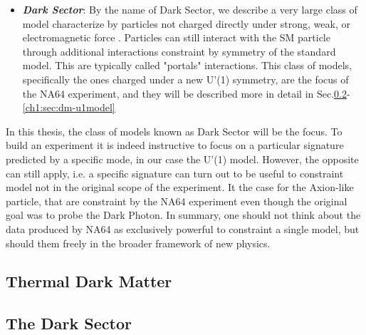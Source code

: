 \begin{itemize}
\item \textbf{\textit{Dark Sector}}: By the name of Dark Sector, we describe a very large class of model characterize by particles not charged directly under strong, weak, or electromagnetic force \cite{alex2016dark}. Particles can still interact with the SM particle through additional interactions constraint by symmetry of the standard model. This are typically called "portals" interactions. This class of models, specifically the ones charged under a new U'(1) symmetry, are the focus of the NA64 experiment, and they will be described more in detail in Sec.\ref{ch1:sec:dm-sector}-\ref{ch1:sec:dm-u1model}
\end{itemize}

In this thesis, the class of models known as Dark Sector will be the focus. To build an experiment it is indeed instructive to focus on a particular signature predicted by a specific mode, in our case the U'(1) model. However, the opposite can still apply, i.e. a specific signature can turn out to be useful to constraint model not in the original scope of the experiment. It the case for the Axion-like particle, that are constraint by the NA64 experiment even though the original goal was to probe the Dark Photon. In summary, one should not think about the data produced by NA64 as exclusively powerful to constraint a single model, but should them freely in the broader framework of new physics.

\subsection{Thermal Dark Matter}
\label{ch1:sec:dm-thermal}

\subsection{The Dark Sector}
\label{ch1:sec:dm-sector}

